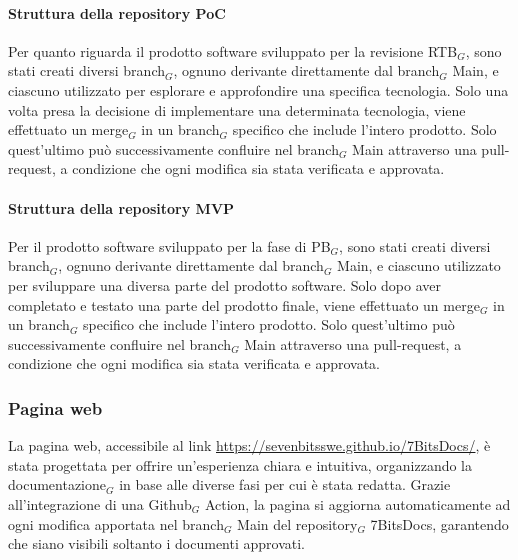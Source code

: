 \documentclass[10pt]{article}
\begin{document}
\begin{justify}
        \paragraph{Struttura della repository PoC}
        Per quanto riguarda il prodotto software sviluppato per la revisione RTB$_G$, sono stati creati diversi branch$_G$, ognuno derivante direttamente dal branch$_G$ Main, e ciascuno utilizzato per esplorare e approfondire una specifica tecnologia. Solo una volta presa la decisione di implementare una determinata tecnologia, viene effettuato un merge$_G$ in un branch$_G$ specifico che include l'intero prodotto. Solo quest'ultimo può successivamente confluire nel branch$_G$ Main attraverso una pull-request, a condizione che ogni modifica sia stata verificata e approvata.
    
        \paragraph{Struttura della repository MVP}
        Per il prodotto software sviluppato per la fase di PB$_G$, sono stati creati diversi branch$_G$, ognuno derivante direttamente dal branch$_G$ Main, e ciascuno utilizzato per sviluppare una diversa parte del prodotto software. Solo dopo aver completato e testato una parte del prodotto finale, viene effettuato un merge$_G$ in un branch$_G$ specifico che include l'intero prodotto. Solo quest'ultimo può successivamente confluire nel branch$_G$ Main attraverso una pull-request, a condizione che ogni modifica sia stata verificata e approvata.

    \subsubsection{Pagina web} 
    La pagina web, accessibile al link \href{https://sevenbitsswe.github.io/7BitsDocs/}{https://sevenbitsswe.github.io/7BitsDocs/}, è stata progettata per offrire un'esperienza chiara e intuitiva, organizzando la documentazione$_G$ in base alle diverse fasi per cui è stata redatta. Grazie all'integrazione di una Github$_G$ Action, la pagina si aggiorna automaticamente ad ogni modifica apportata nel branch$_G$ Main del repository$_G$ 7BitsDocs, garantendo che siano visibili soltanto i documenti approvati.


\end{justify}
\end{document}
